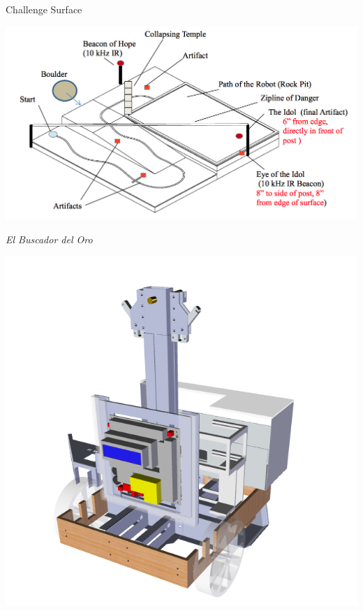 \documentclass[aspectratio=43]{beamer}
\begin{document}
  \begin{frame}{Challenge Surface}
    \begin{center}
      \includegraphics[scale = 0.3]{Course.png}
    \end{center}
  \end{frame} 
  

  \begin{frame}{\textit{El Buscador del Oro}}
    \begin{center}
      \includegraphics[scale = 0.3]{BuscDelOro.png}
    \end{center}
  \end{frame} 
  
\end{document}
